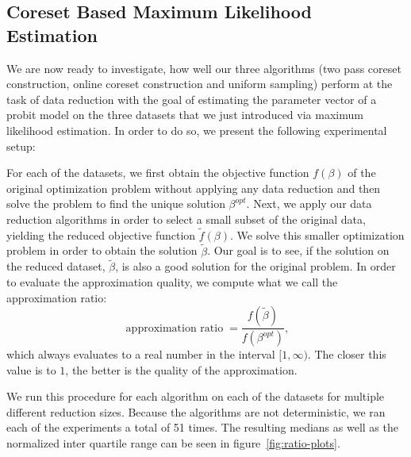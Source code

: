 \subsection{Coreset Based Maximum Likelihood Estimation}

We are now ready to investigate, how well our three algorithms
(two pass coreset construction, online coreset construction and
uniform sampling) perform at the task of data reduction
with the goal of estimating the
parameter vector of a probit model on the three datasets that
we just introduced via maximum likelihood estimation.
In order to do so, we present the following experimental setup:

For each of the datasets, we first obtain the objective function
$f(\beta)$ of the original optimization problem without applying
any data reduction and then solve the problem to find the
unique solution $\beta^{opt}$.
Next, we apply our data reduction algorithms in order to select
a small subset of the original data, yielding the reduced
objective function $\tilde{f}(\beta)$. We solve this
smaller optimization problem in order to obtain the solution
$\tilde{\beta}$. Our goal is to see, if the solution on the
reduced dataset, $\tilde{\beta}$, is also a good solution
for the original problem. In order to evaluate the approximation
quality, we compute what we call the approximation ratio:
\begin{equation*}
    \operatorname{approximation\ ratio} = \frac{f(\tilde{\beta})}{f(\beta^{opt})},
\end{equation*}
which always evaluates to a real number in the interval $[1, \infty)$.
The closer this value is to $1$, the better is the quality of
the approximation.

We run this procedure for each algorithm on each of the datasets
for multiple different reduction sizes. Because the algorithms
are not deterministic, we ran each of the experiments a total
of 51 times. The resulting medians as well as the normalized
inter quartile range can be seen in figure~\ref{fig:ratio-plots}.


